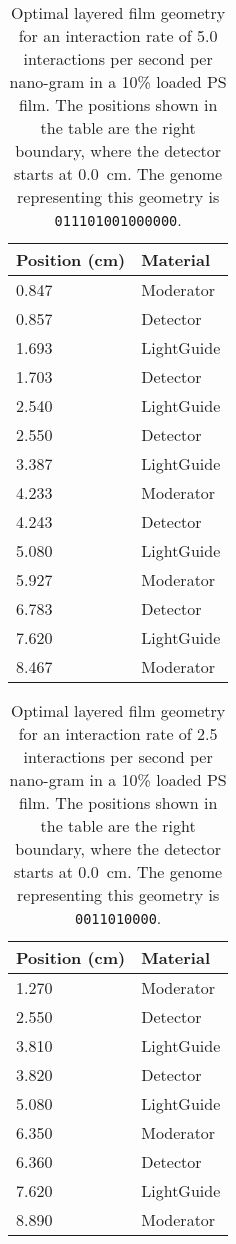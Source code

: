 \begin{table}
	\caption[Optimal Layered Film Geometry for 5.0 interaction per second per nanogram Cf-252]{Optimal layered film geometry for an interaction rate of 5.0 interactions per second per nano-gram   in a 10\%  loaded PS film. The positions shown in the table are the right boundary, where the detector starts at \SI{0.0}{\cm}. The genome representing this geometry is \texttt{011101001000000}.}
	\label{tab:OptGeoDetailed5}
	\begin{tabular}{m{3cm} m{4cm}}
	\toprule
	Position (\si{\cm}) & Material \\
	\midrule
0.847&Moderator\\
0.857&Detector\\
1.693&LightGuide\\
1.703&Detector\\
2.540&LightGuide\\
2.550&Detector\\
3.387&LightGuide\\
4.233&Moderator\\
4.243&Detector\\
5.080&LightGuide\\
5.927&Moderator\\
6.783&Detector\\
7.620&LightGuide\\
8.467&Moderator\\
	\bottomrule
	\end{tabular}
\end{table}
\begin{table}
	\caption[Optimal Layered Film Geometry for 2.5 interaction per second per nanogram Cf-252]{Optimal layered film geometry for an interaction rate of 2.5 interactions per second per nano-gram  in a 10\%  loaded PS film. The positions shown in the table are the right boundary, where the detector starts at \SI{0.0}{\cm}. The genome representing this geometry is \texttt{0011010000}.}
	\label{tab:OptGeoDetailed25}
	\begin{tabular}{m{3cm} m{4cm}}
	\toprule
	Position (\si{\cm}) & Material \\
	\midrule
1.270&Moderator\\
2.550&Detector\\
3.810&LightGuide\\
3.820&Detector\\
5.080&LightGuide\\
6.350&Moderator\\
6.360&Detector\\
7.620&LightGuide\\
8.890&Moderator\\
	\bottomrule
	\end{tabular}
\end{table}

